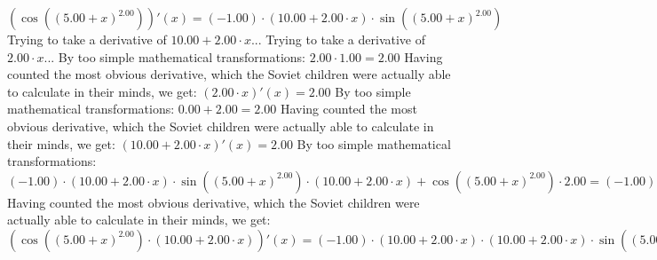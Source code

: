 \documentclass{article}
\begin{document}
$( \cos {\left({\left({{5.00} + {x}}\right) ^ {2.00}}\right)} )'(x) = {\left({-1.00}\right) \cdot {\left({{10.00} + {{2.00} \cdot {x}}}\right) \cdot  \sin {\left({\left({{5.00} + {x}}\right) ^ {2.00}}\right)} }}$\newline
\newline
Trying to take a derivative of ${{10.00} + {{2.00} \cdot {x}}}$...\newline
\newline
Trying to take a derivative of ${{2.00} \cdot {x}}$...\newline
\newline
By too simple mathematical transformations:
 ${{2.00} \cdot {1.00}} = {2.00}$ 
 \newline
 \newline 
Having counted the most obvious derivative, which the Soviet children were actually able to calculate in their minds, we get:
$({{2.00} \cdot {x}})'(x) = {2.00}$\newline
\newline
By too simple mathematical transformations:
 ${{0.00} + {2.00}} = {2.00}$ 
 \newline
 \newline 
Having counted the most obvious derivative, which the Soviet children were actually able to calculate in their minds, we get:
$({{10.00} + {{2.00} \cdot {x}}})'(x) = {2.00}$\newline
\newline
By too simple mathematical transformations:
 ${{{\left({-1.00}\right) \cdot {\left({{10.00} + {{2.00} \cdot {x}}}\right) \cdot  \sin {\left({\left({{5.00} + {x}}\right) ^ {2.00}}\right)} }} \cdot \left({{10.00} + {{2.00} \cdot {x}}}\right)} + { \cos {\left({\left({{5.00} + {x}}\right) ^ {2.00}}\right)}  \cdot {2.00}}} = {{\left({-1.00}\right) \cdot {\left({{10.00} + {{2.00} \cdot {x}}}\right) \cdot {\left({{10.00} + {{2.00} \cdot {x}}}\right) \cdot  \sin {\left({\left({{5.00} + {x}}\right) ^ {2.00}}\right)} }}} + {{2.00} \cdot  \cos {\left({\left({{5.00} + {x}}\right) ^ {2.00}}\right)} }}$ 
 \newline
 \newline 
Having counted the most obvious derivative, which the Soviet children were actually able to calculate in their minds, we get:
$({ \cos {\left({\left({{5.00} + {x}}\right) ^ {2.00}}\right)}  \cdot \left({{10.00} + {{2.00} \cdot {x}}}\right)})'(x) = {{\left({-1.00}\right) \cdot {\left({{10.00} + {{2.00} \cdot {x}}}\right) \cdot {\left({{10.00} + {{2.00} \cdot {x}}}\right) \cdot  \sin {\left({\left({{5.00} + {x}}\right) ^ {2.00}}\right)} }}} + {{2.00} \cdot  \cos {\left({\left({{5.00} + {x}}\right) ^ {2.00}}\right)} }}$\newline
\end{document}
